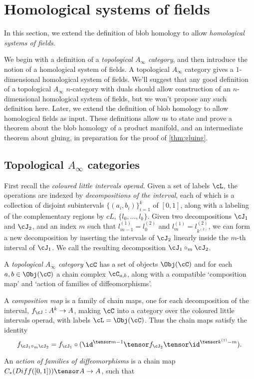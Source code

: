 \section{Homological systems of fields}

In this section, we extend the definition of blob homology to allow \emph{homological systems of fields}.

We begin with a definition of a \emph{topological $A_\infty$ category}, and then introduce the notion of a homological system of fields. A topological $A_\infty$ category gives a $1$-dimensional homological system of fields. We'll suggest that any good definition of a topological $A_\infty$ $n$-category with duals should allow construction of an $n$-dimensional homological system of fields, but we won't propose any such definition here. Later, we extend the definition of blob homology to allow homological fields as input. These definitions allow us to state and prove a theorem about the blob homology of a product manifold, and an intermediate theorem about gluing, in preparation for the proof of \ref{thm:gluing}.

\subsection{Topological $A_\infty$ categories}

First recall the \emph{coloured little intervals operad}. Given a set of labels $\cL$, the operations are indexed by \emph{decompositions of the interval}, each of which is a collection of disjoint subintervals $\{(a_i,b_i)\}_{i=1}^k$ of $[0,1]$, along with a labeling of the complementary regions by $cL$, $\{l_0, \ldots, l_k\}$.  Given two decompositions $\cJ_1$ and $\cJ_2$, and an index $m$ such that $l^{(1)}_{m-1} = l^{(2)}_0$ and $l^{(1)}_{m} = l^{(2)}_{k^{(2)}}$, we can form a new decomposition by inserting the intervals of $\cJ_2$ linearly inside the $m$-th interval of $\cJ_1$. We call the resulting decomposition $\cJ_1 \circ_m \cJ_2$.

\begin{defn}
A \emph{topological $A_\infty$ category} $\cC$ has a set of objects $\Obj(\cC)$ and for each $a,b \in \Obj(\cC)$ a chain complex $\cC_{a,b}$, along with a compatible `composition map' and `action of families of diffeomorphisms'.

A \emph{composition map} is a family of chain maps, one for each decomposition of the interval, $f_\cJ : A^k \to A$, making $\cC$ into a category over the coloured little intervals operad, with labels $\cL = \Obj(\cC)$. Thus the chain maps satisfy the identity 
\begin{equation*}
f_{\cJ_1 \circ_m \cJ_2} = f_{\cJ_1} \circ (\id^{\tensor m-1} \tensor f_{\cJ_2} \tensor \id^{\tensor k^{(1)} - m}).
\end{equation*}

An \emph{action of families of diffeomorphisms} is a chain map $C_*(Diff([0,1])) \tensor A \to A$, such that  
\end{defn}


